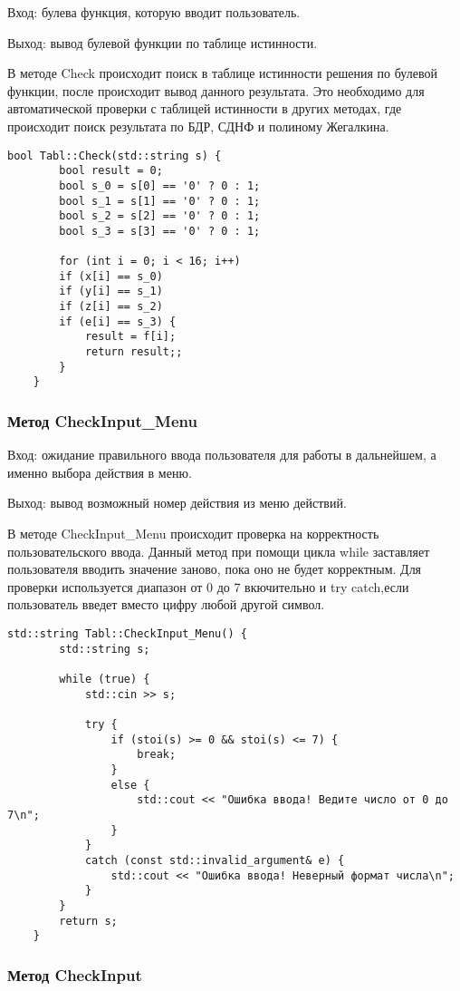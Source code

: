 \documentclass[10pt,a4paper,final]{article} %
\begin{document}
\par Вход: булева функция, которую вводит пользователь.
\par Выход: вывод булевой функции по таблице истинности.
\par В методе  Check происходит поиск в таблице истинности решения по булевой функции, после происходит вывод данного результата. Это необходимо для автоматической проверки с таблицей истинности в других методах, где происходит поиск результата по БДР, СДНФ и полиному Жегалкина.
\begin{lstlisting}[caption={Метод Check}]
	bool Tabl::Check(std::string s) {
		bool result = 0;
		bool s_0 = s[0] == '0' ? 0 : 1;
		bool s_1 = s[1] == '0' ? 0 : 1;
		bool s_2 = s[2] == '0' ? 0 : 1;
		bool s_3 = s[3] == '0' ? 0 : 1;
		
		for (int i = 0; i < 16; i++)
		if (x[i] == s_0)
		if (y[i] == s_1)
		if (z[i] == s_2)
		if (e[i] == s_3) {
			result = f[i];
			return result;;
		}
	}
\end{lstlisting}

\subsubsection{Метод CheckInput\_Menu}

\par Вход: ожидание правильного ввода пользователя для работы в дальнейшем, а именно выбора действия в меню.
\par Выход: вывод возможный номер действия из меню действий.
\par В методе  CheckInput\_Menu происходит проверка на корректность пользовательского ввода. Данный метод при помощи цикла while заставляет пользователя вводить значение заново, пока оно не будет корректным. Для проверки используется диапазон от 0 до 7 вкючительно и try catch,если пользователь введет вместо цифру любой другой символ. 
\begin{lstlisting}[caption={Метод CheckInput\_Menu}]
	std::string Tabl::CheckInput_Menu() {
		std::string s;
		
		while (true) {
			std::cin >> s;
		
			try {
				if (stoi(s) >= 0 && stoi(s) <= 7) {
					break;
				}
				else {
					std::cout << "Ошибка ввода! Ведите число от 0 до 7\n";
				}
			}
			catch (const std::invalid_argument& e) {
				std::cout << "Ошибка ввода! Неверный формат числа\n";
			}
		}
		return s;
	}
\end{lstlisting}


\subsubsection{Метод CheckInput}
\end{document}
